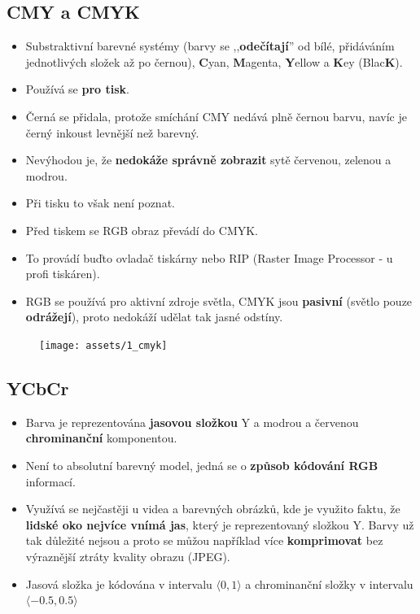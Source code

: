 \subsection{CMY a CMYK}
\begin{itemize}
    \item Substraktivní barevné systémy (barvy se ,,\textbf{odečítají}'' od bílé, přidáváním jednotlivých složek až po černou), \textbf{C}yan, \textbf{M}agenta, \textbf{Y}ellow a \textbf{K}ey (Blac\textbf{K}).
    \item Používá se \textbf{pro tisk}.
    \item Černá se přidala, protože smíchání CMY nedává plně černou barvu, navíc je černý inkoust levnější než barevný.
    \item Nevýhodou je, že \textbf{nedokáže správně zobrazit} sytě červenou, zelenou a modrou.
    \item Při tisku to však není poznat.
    \item Před tiskem se RGB obraz převádí do CMYK.
    \item To provádí buďto ovladač tiskárny nebo RIP (Raster Image Processor - u profi tiskáren).
    \item RGB se používá pro aktivní zdroje světla, CMYK jsou \textbf{pasivní} (světlo pouze \textbf{odrážejí}), proto nedokáží udělat tak jasné odstíny.
\end{itemize}
\begin{figure}[H]
    \centering
    \texttt{[image: assets/1\_cmyk]}
\end{figure}

\subsection{YCbCr}
\begin{itemize}
    \item Barva je reprezentována \textbf{jasovou složkou} Y a modrou a červenou \textbf{chrominanční} komponentou.
    \item Není to absolutní barevný model, jedná se o \textbf{způsob kódování RGB} informací.
    \item Využívá se nejčastěji u videa a barevných obrázků, kde je využito faktu, že \textbf{lidské oko nejvíce vnímá jas}, který je reprezentovaný složkou Y. Barvy už tak důležité nejsou a proto se můžou například více \textbf{komprimovat} bez výraznější ztráty kvality obrazu (JPEG).
    \item Jasová složka je kódována v intervalu $\langle0, 1\rangle$ a chrominanční složky v intervalu $\langle-0.5, 0.5\rangle$
\end{itemize}

